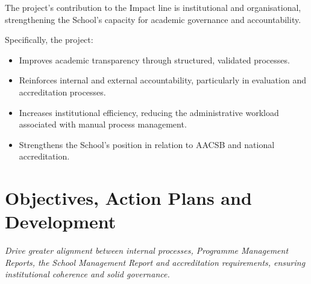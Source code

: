 \documentclass[11pt,a4paper]{scrreprt}
\begin{document}
The project's contribution to the Impact line is institutional and organisational, strengthening the School's capacity for academic governance and accountability. 

Specifically, the project: 

\begin{itemize}[noitemsep,topsep=2pt]
\item Improves academic transparency through structured, validated processes. 

\item Reinforces internal and external accountability, particularly in evaluation and accreditation processes. 

\item Increases institutional efficiency, reducing the administrative workload associated with manual process management. 

\item Strengthens the School's position in relation to AACSB and national accreditation. 
\end{itemize}

\newpage
{}
\section{Objectives, Action Plans and Development}
{\small\color{mutedcolor}\itshape Drive greater alignment between internal processes, Programme Management Reports, the School Management Report and accreditation requirements, ensuring institutional coherence and solid governance.}\par\vspace{6pt}
\end{document}
